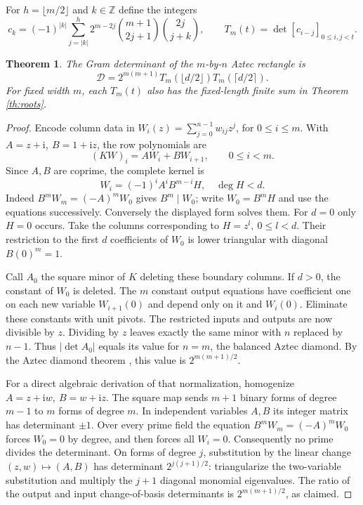 \documentclass[11pt,letterpaper]{article}
\newtheorem{theorem}{Theorem}[section]
\newcommand{\ii}{\mathrm i}
\newcommand{\Z}{\mathbb Z}
\newcommand{\Gram}{\mathcal D}
\begin{document}
For \(h=\lfloor m/2\rfloor\) and \(k\in\Z\) define the integers
\[
 c_k=(-1)^{|k|}\sum_{j=|k|}^{h}2^{m-2j}\binom{m+1}{2j+1}\binom{2j}{j+k},
 \qquad T_m(t)=\det[c_{i-j}]_{0\le i,j<t}.
\]
\begin{theorem}\label{th:aztec}
The Gram determinant of the \(m\)-by-\(n\) Aztec rectangle is
\[
 \boxed{\displaystyle
 \Gram=2^{m(m+1)}T_m(\lfloor d/2\rfloor)T_m(\lceil d/2\rceil).}
\]
For fixed width \(m\), each \(T_m(t)\) also has the fixed-length finite sum in Theorem \ref{th:roots}.
\end{theorem}
\begin{proof}
Encode column data in \(W_i(z)=\sum_{j=0}^{n-1}w_{ij}z^j\), for \(0\le i\le m\). With \(A=z+\ii,\ B=1+\ii z\), the row polynomials are
\[
 (KW)_i=A W_i+B W_{i+1},\qquad 0\le i<m.
\]
Since \(A,B\) are coprime, the complete kernel is
\begin{equation}\label{eq:layer}
 W_i=(-1)^i A^i B^{m-i}H,\quad \deg H<d.
\end{equation}
Indeed \(B^mW_m=(-A)^mW_0\) gives \(B^m\mid W_0\); write \(W_0=B^mH\) and use the equations successively. Conversely the displayed form solves them. For \(d=0\) only \(H=0\) occurs. Take the columns corresponding to \(H=z^l,\ 0\le l<d\). Their restriction to the first \(d\) coefficients of \(W_0\) is lower triangular with diagonal \(B(0)^m=1\).

Call \(A_0\) the square minor of \(K\) deleting these boundary columns. If \(d>0\), the constant of \(W_0\) is deleted. The \(m\) constant output equations have coefficient one on each new variable \(W_{i+1}(0)\) and depend only on it and \(W_i(0)\). Eliminate these constants with unit pivots. The restricted inputs and outputs are now divisible by \(z\). Dividing by \(z\) leaves exactly the same minor with \(n\) replaced by \(n-1\). Thus \(|\det A_0|\) equals its value for \(n=m\), the balanced Aztec diamond. By the Aztec diamond theorem \cite{eklp}, this value is \(2^{m(m+1)/2}\).

For a direct algebraic derivation of that normalization, homogenize \(A=z+\ii w,\ B=w+\ii z\). The square map sends \(m+1\) binary forms of degree \(m-1\) to \(m\) forms of degree \(m\). In independent variables \(A,B\) its integer matrix has determinant \(\pm1\). Over every prime field the equation \(B^m W_m=(-A)^m W_0\) forces \(W_0=0\) by degree, and then forces all \(W_i=0\). Consequently no prime divides the determinant. On forms of degree \(j\), substitution by the linear change \((z,w)\mapsto(A,B)\) has determinant \(2^{j(j+1)/2}\): triangularize the two-variable substitution and multiply the \(j+1\) diagonal monomial eigenvalues. The ratio of the output and input change-of-basis determinants is \(2^{m(m+1)/2}\), as claimed.


\end{proof}
\end{document}
